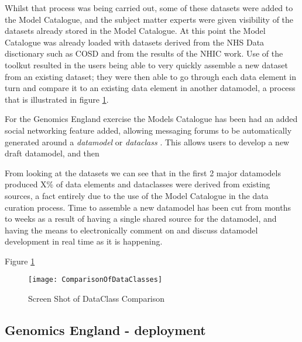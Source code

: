 Whilst that process was being carried out, some of these datasets were added to the Model Catalogue, and the subject matter experts were given visibility of the datasets already stored in the Model Catalogue. At this point the Model Catalogue was already loaded with datasets derived from the NHS Data disctionary such as COSD and from the results of the NHIC work. Use of the toolkut resulted in the users being able to very quickly assemble a new dataset from an existing dataset; they were then able to go through each data element in turn and compare it to an existing data element in another datamodel, a process that is illustrated in figure \ref{fig:dataClassComparison}.

For the Genomics England exercise the Models Catalogue has been had an added social networking feature added, allowing messaging forums to be automatically generated around a \emph{datamodel} or \emph{dataclass} . This allows users to develop a new draft datamodel, and then 

From looking at the datasets we can see that in the first 2 major datamodels produced X\% of data elements and dataclasses were derived from existing sources, a fact entirely due to the use of the Model Catalogue in the data curation process. Time to assemble a new datamodel has been cut from months to weeks as a result of having a single shared source for the datamodel, and having the means to electronically comment on and discuss datamodel development in real time as it is happening.



 Figure \ref{fig:dataClassComparison}
 \begin{figure}[here]
 	\texttt{[image: ComparisonOfDataClasses]}
 	\caption{Screen Shot of DataClass Comparison} 
 	\label{fig:dataClassComparison}	
 \end{figure}



\subsection{Genomics England -  deployment}
